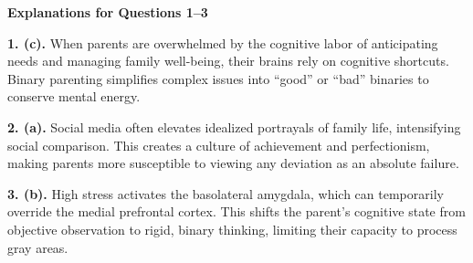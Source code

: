 \begin{practiceexercise}
\textbf{Explanations for Questions 1--3}

\textbf{1. (c).} When parents are overwhelmed by the cognitive labor of anticipating needs and managing family well-being, their brains rely on cognitive shortcuts. Binary parenting simplifies complex issues into ``good'' or ``bad'' binaries to conserve mental energy.

\textbf{2. (a).} Social media often elevates idealized portrayals of family life, intensifying social comparison. This creates a culture of achievement and perfectionism, making parents more susceptible to viewing any deviation as an absolute failure.

\textbf{3. (b).} High stress activates the basolateral amygdala, which can temporarily override the medial prefrontal cortex. This shifts the parent's cognitive state from objective observation to rigid, binary thinking, limiting their capacity to process gray areas.
\vspace{\fill}
\newpage


\end{practiceexercise}
